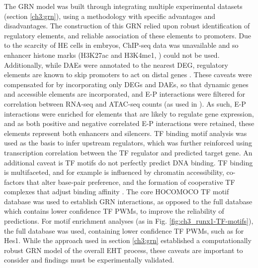 The GRN model was built through integrating multiple experimental datasets (section \ref{ch3:grn}), using a methodology with specific advantages and disadvantages. The construction of this GRN relied upon robust identification of regulatory elements, and reliable association of these elements to promoters. Due to the scarcity of HE cells in embryos, ChIP-seq data was unavailable and so enhancer histone marks (H3K27ac and H3K4me1, \cite{heintzman_histone_2009, heintzman_distinct_2007, creyghton_histone_2010}) could not be used. Additionally, while DAEs were annotated to the nearest DEG, regulatory elements are known to skip promoters to act on distal genes \citep{chepelev_characterization_2012}. These caveats were compensated for by incorporating only DEGs and DAEs, so that dynamic genes and accessible elements are incorporated, and E-P interactions were filtered for correlation between RNA-seq and ATAC-seq counts (as used in \cite{sheffield_patterns_2013, hariprakash_computational_2019}). As such, E-P interactions were enriched for elements that are likely to regulate gene expression, and as both positive and negative correlated E-P interactions were retained, these elements represent both enhancers and silencers. TF binding motif analysis was used as the basis to infer upstream regulators, which was further reinforced using transcription correlation between the TF regulator and predicted target gene. An additional caveat is TF motifs do not perfectly predict DNA binding. TF binding is multifaceted, and for example is influenced by chromatin accessibility, co-factors that alter base-pair preference, and the formation of cooperative TF complexes that adjust binding affinity \citep{morgunova_structural_2017, spitz_transcription_2012}. The core HOCOMOCO TF motif database was used to establish GRN interactions, as opposed to the full database which contains lower confidence TF PWMs, to improve the reliability of predictions. For motif enrichment analyses (as in Fig. \ref{fig:ch3_runx1-TF-motifs}), the full database was used, containing lower confidence TF PWMs, such as for Hes1. While the approach used in section \ref{ch3:grn} established a computationally robust GRN model of the overall EHT process, these caveats are important to consider and findings must be experimentally validated.

